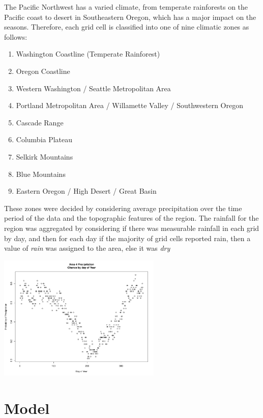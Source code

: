 \documentclass{article}
\begin{document}
The Pacific Northwest has a varied climate, from temperate rainforests on the Pacific coast to desert in Southeastern Oregon, which has a major impact on the seasons. Therefore, each grid cell is classified into one of nine climatic zones as follows:
\begin{enumerate}
\item Washington Coastline (Temperate Rainforest)
\item Oregon Coastline
\item Western Washington / Seattle Metropolitan Area
\item Portland Metropolitan Area / Willamette Valley / Southwestern Oregon
\item Cascade Range
\item Columbia Plateau
\item Selkirk Mountains
\item Blue Mountains
\item Eastern Oregon / High Desert / Great Basin
\end{enumerate}
These zones were decided by considering average precipitation over the time period of the data and the topographic features of the region. The rainfall for the region was aggregated by considering if there was measurable rainfall in each grid by day, and then for each day if the majority of grid cells reported rain, then a value of \textit{rain} was assigned to the area, else it was \textit{dry}

\includegraphics[width = .4\textwidth, height = 6cm]{Area4PrecipByDay}


\section{Model}

\end{document}
